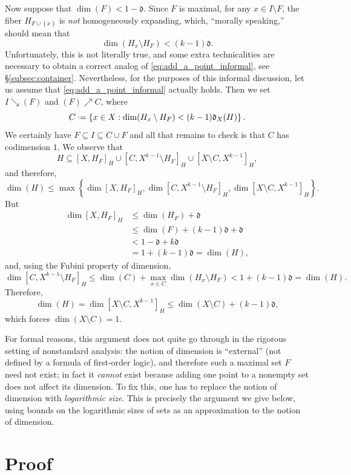 \documentclass[12pt,reqno]{amsart}
\theoremstyle{plain}
\theoremstyle{definition}
\theoremstyle{remark}
\newcommand{\0}{\mathbb{\emptyset}}
\newcommand{\set}[1]{\left\{ #1 \right\}}
\newcommand*{\defeq}{\mathrel{\vcenter{\baselineskip0.5ex \lineskiplimit0pt \hbox{\scriptsize.}\hbox{\scriptsize.}}}=}
\newcommand{\dF}{\mathfrak{d}}
\newcommand{\prel}{\searrow}
\newcommand{\crel}{\nearrow}
\begin{document}
Now suppose that $\dim(F) < 1 - \dF$. Since $F$ is maximal, for any $x \in I \setminus F$, the fiber $H_{F \cup \set{x}}$ is \emph{not} homogeneously expanding, which, ``morally speaking,'' should mean that
\begin{equation}\label{eq:add_a_point_informal}
	\dim(H_x \setminus H_F) < (k-1) \dF.
\end{equation}
Unfortunately, this is not literally true, and some extra technicalities are necessary to obtain a correct analog of \eqref{eq:add_a_point_informal}, see \S\ref{subsec:container}. Nevertheless, for the purposes of this informal discussion, let us assume that \eqref{eq:add_a_point_informal} actually holds. Then we set $I \prel (F)$ and $(F) \crel C$, where
\[
C \defeq \set{x \in X : \dim(H_x \setminus H_F) < (k-1) \dF_X(H)}.
\]
We certainly have $F \subseteq I \subseteq C \cup F$ and all that remains to check is that $C$ has codimension $1$. We observe that
\[
H \subseteq [X, H_F]_H \cup [C, X^{k-1} \setminus H_F]_H \cup [X \setminus C, X^{k-1}]_H,
\]
and therefore,
\[
\dim(H) \leq \max \set{\dim [X, H_F]_H, \dim [C, X^{k-1} \setminus H_F]_H, \dim [X \setminus C, X^{k-1}]_H}.
\]
But
\begin{align*}
\dim[X, H_F]_H
&\leq 
\dim(H_F) + \dF
\\
&\leq
\dim(F) + (k-1)\dF + \dF
\\
&< 1-\dF + k\dF
\\
&=
1 + (k-1) \dF
=
\dim(H),
\end{align*}
and, using the Fubini property of dimension,
\[
\dim [C, X^{k-1} \setminus H_F]_H \leq \dim(C) + \max_{x \in C} \dim(H_x\setminus H_F) < 1 + (k-1) \dF = \dim(H).
\]
Therefore,
\[
\dim(H) = \dim [X \setminus C, X^{k-1}]_H \leq \dim(X \setminus C) + (k-1) \dF,
\]
which forces $\dim(X \setminus C) = 1$.

For formal reasons, this argument does not quite go through in the rigorous setting of nonstandard analysis: the notion of dimension is ``external'' (not defined by a formula of first-order logic), and therefore such a maximal set $F$ need not exist; in fact it \emph{cannot} exist because adding one point to a nonempty set does not affect its dimension. To fix this, one has to replace the notion of dimension with \emph{logarithmic size}. This is precisely the argument we give below, using bounds on the logarithmic sizes of sets as an approximation to the notion of dimension.

\section{Proof}\label{sec:proof}
\end{document}
